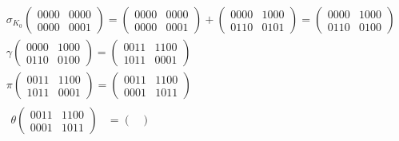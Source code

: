 \documentclass[fleqn]{article}
\begin{document}
    \begin{equation*}
        \begin{aligned}
            &\sigma_{K_0}
            \begin{pmatrix}
                0000 & 0000 \\
                0000 & 0001
            \end{pmatrix} = 
            \begin{pmatrix}
                0000 & 0000 \\
                0000 & 0001
            \end{pmatrix} + 
            \begin{pmatrix}
                0000 & 1000 \\
                0110 & 0101
            \end{pmatrix} = 
            \begin{pmatrix}
                0000 & 1000 \\
                0110 & 0100
            \end{pmatrix} \\
            &\gamma \begin{pmatrix}
                0000 & 1000 \\
                0110 & 0100
            \end{pmatrix} =
            \begin{pmatrix}
                0011 & 1100 \\
                1011 & 0001
            \end{pmatrix} \\
            &\pi \begin{pmatrix}
                0011 & 1100 \\
                1011 & 0001
            \end{pmatrix} =
            \begin{pmatrix}
                0011 & 1100 \\
                0001 & 1011
            \end{pmatrix} \\
            &\begin{aligned} 
                \theta 
                \begin{pmatrix}
                    0011 & 1100 \\
                    0001 & 1011
                \end{pmatrix} &=
                \begin{pmatrix}

\end{pmatrix}
\end{aligned}
\end{aligned}
\end{equation*}
\end{document}
